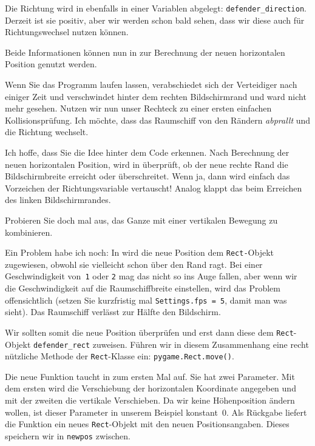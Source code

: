Die Richtung wird in  ebenfalls in einer Variablen abgelegt: \texttt{defender\_direction}. Derzeit ist sie positiv, aber wir werden schon bald sehen, dass wir diese auch für Richtungswechsel nutzen können.

Beide Informationen können nun in  zur Berechnung der neuen horizontalen Position genutzt werden.

Wenn Sie das Programm laufen lassen, verabschiedet sich der Verteidiger nach einiger Zeit und verschwindet hinter dem rechten Bildschirmrand und ward nicht mehr gesehen. Nutzen wir nun unser Rechteck zu einer ersten einfachen Kollisionsprüfung. Ich möchte, dass das Raumschiff von den Rändern \emph{abprallt} und die Richtung wechselt. 


Ich hoffe, dass Sie die Idee hinter dem Code erkennen. Nach Berechnung der neuen horizontalen Position, wird in  überprüft, ob der neue rechte Rand die Bildschirmbreite erreicht oder überschreitet. Wenn ja, dann wird einfach das Vorzeichen der Richtungsvariable vertauscht! Analog klappt das beim Erreichen des linken Bildschirmrandes. 

Probieren Sie doch mal aus, das Ganze mit einer vertikalen Bewegung zu kombinieren.

Ein Problem habe ich noch: In  wird die neue Position dem \texttt{Rect-}Objekt zugewiesen, obwohl sie vielleicht schon über den Rand ragt. Bei einer Geschwindigkeit von~\texttt{1} oder \texttt{2} mag das nicht so ins Auge fallen, aber wenn wir die Geschwindigkeit auf die Raumschiffbreite einstellen, wird das Problem offensichtlich (setzen Sie kurzfristig mal \texttt{Settings.fps = 5}, damit man was sieht). Das Raumschiff verlässt zur Hälfte den Bildschirm. 

Wir sollten somit die neue Position überprüfen und erst dann diese dem \texttt{Rect}-Objekt \texttt{defender\_rect} zuweisen. Führen wir in diesem Zusammenhang eine recht nützliche Methode der \texttt{Rect}-Klasse ein: \texttt{pygame.Rect.move()}.


Die neue Funktion taucht in  zum ersten Mal auf. Sie hat zwei Parameter. Mit dem ersten wird die Verschiebung der horizontalen Koordinate angegeben und mit der zweiten die vertikale Verschieben. Da wir keine Höhenposition ändern wollen, ist dieser Parameter in unserem Beispiel konstant~0. Als Rückgabe liefert die Funktion ein neues \texttt{Rect}-Objekt mit den neuen Positionsangaben. Dieses speichern wir in \texttt{newpos} zwischen.

